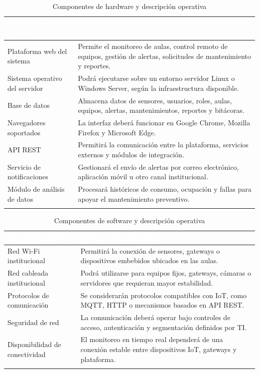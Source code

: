 \begingroup
\small
\begin{longtable}{|P{0.5000}|P{0.5000}|}
\hline
{}\textcolor{white}{\textbf{Componente de software}} & \textcolor{white}{\textbf{Descripción operativa}} \\ \hline
Plataforma web del sistema & Permite el monitoreo de aulas, control remoto de equipos, gestión de alertas, solicitudes de mantenimiento y reportes. \\ \hline
Sistema operativo del servidor & Podrá ejecutarse sobre un entorno servidor Linux o Windows Server, según la infraestructura disponible. \\ \hline
Base de datos & Almacena datos de sensores, usuarios, roles, aulas, equipos, alertas, mantenimientos, reportes y bitácoras. \\ \hline
Navegadores soportados & La interfaz deberá funcionar en Google Chrome, Mozilla Firefox y Microsoft Edge. \\ \hline
API REST & Permitirá la comunicación entre la plataforma, servicios externos y módulos de integración. \\ \hline
Servicio de notificaciones & Gestionará el envío de alertas por correo electrónico, aplicación móvil u otro canal institucional. \\ \hline
Módulo de análisis de datos & Procesará históricos de consumo, ocupación y fallas para apoyar el mantenimiento preventivo. \\ \hline
\caption{Componentes de hardware y descripción operativa}
\end{longtable}
\endgroup

\begingroup
\small
\begin{longtable}{|P{0.5000}|P{0.5000}|}
\hline
{}\textcolor{white}{\textbf{Elemento de red}} & \textcolor{white}{\textbf{Descripción operativa}} \\ \hline
Red Wi-Fi institucional & Permitirá la conexión de sensores, gateways o dispositivos embebidos ubicados en las aulas. \\ \hline
Red cableada institucional & Podrá utilizarse para equipos fijos, gateways, cámaras o servidores que requieran mayor estabilidad. \\ \hline
Protocolos de comunicación & Se considerarán protocolos compatibles con IoT, como MQTT, HTTP o mecanismos basados en API REST. \\ \hline
Seguridad de red & La comunicación deberá operar bajo controles de acceso, autenticación y segmentación definidos por TI. \\ \hline
Disponibilidad de conectividad & El monitoreo en tiempo real dependerá de una conexión estable entre dispositivos IoT, gateways y plataforma. \\ \hline
\caption{Componentes de software y descripción operativa}
\end{longtable}
\endgroup

